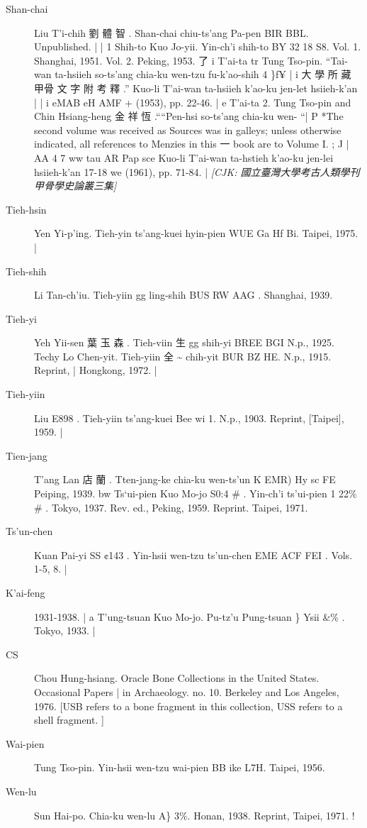 \begin{description}
  \item[Shan-chai] Liu T'i-chih 劉 體 智 . Shan-chai chiu-ts'ang Pa-pen BIR BBL. Unpublished. | | 1 Shih-to Kuo Jo-yii. Yin-ch'i shih-to BY 32 18 S8. Vol. 1. Shanghai, 1951. Vol. 2. Peking, 1953. 了 i T'ai-ta tr Tung Tso-pin. ``Tai-wan ta-hsiieh so-ts'ang chia-ku wen-tzu fu-k'ao-shih 4 \}f¥ | i 大 學 所 藏 甲骨 文 字 附 考 釋 .'' Kuo-li T'ai-wan ta-hsiieh k'ao-ku jen-let hsiieh-k'an | | i eMAB eH AMF + (1953), pp. 22-46. | e T'ai-ta 2. Tung Tso-pin and Chin Hsiang-heng 金 祥 恆 .````Pen-hsi so-ts'ang chia-ku wen- ``| P *The second volume was received as Sources was in galleys; unless otherwise indicated, all references to Menzies in this 一 book are to Volume I. ; J | AA 4 7 ww tau AR Pap sce Kuo-li T'ai-wan ta-hstieh k'ao-ku jen-lei hsiieh-k'an 17-18 we (1961), pp. 71-84. | \hfill\textit{[CJK: 國立臺灣大學考古人類學刊 甲骨學史論叢三集]}
  \item[T\textquotesingle{}ieh-hsin] Yen Yi-p'ing. Tieh-yin ts'ang-kuei hyin-pien WUE Ga Hf Bi. Taipei, 1975. |
  \item[Tieh-shih] Li Tan-ch'iu. Tieh-yiin gg ling-shih BUS RW AAG . Shanghai, 1939.
  \item[Tieh-yi] Yeh Yii-sen 葉 玉 森 . Tieh-viin 生 gg shih-yi BREE BGI N.p., 1925. Techy Lo Chen-yit. Tieh-yiin 全 \~{} chih-yit BUR BZ HE. N.p., 1915. Reprint, | Hongkong, 1972. |
  \item[Tieh-yiin] Liu E898 . Tieh-yiin ts'ang-kuei Bee wi 1. N.p., 1903. Reprint, [Taipei], 1959. |
  \item[Tien-jang] T'ang Lan 店 蘭 . Tten-jang-ke chia-ku wen-ts'un K EMR) Hy sc FE Peiping, 1939. bw Ts`ui-pien Kuo Mo-jo S0:4 \# . Yin-ch'i ts'ui-pien 1 22\% \# . Tokyo, 1937. Rev. ed., Peking, 1959. Reprint. Taipei, 1971.
  \item[Ts'un-chen] Kuan Pai-yi SS ¢143 . Yin-hsii wen-tzu ts'un-chen EME ACF FEI . Vols. 1-5, 8. |
  \item[K'ai-feng] 1931-1938. | a T'ung-tsuan Kuo Mo-jo. Pu-tz'u Pung-tsuan \} Ysii \&\% . Tokyo, 1933. |
  \item[CS] Chou Hung-hsiang. Oracle Bone Collections in the United States. Occasional Papers | in Archaeology. no. 10. Berkeley and Los Angeles, 1976. [USB refers to a bone fragment in this collection, USS refers to a shell fragment. ]
  \item[Wai-pien] Tung Tso-pin. Yin-hsii wen-tzu wai-pien BB ike L7H. Taipei, 1956.
  \item[Wen-lu] Sun Hai-po. Chia-ku wen-lu A\} 3\%. Honan, 1938. Reprint, Taipei, 1971. !

\end{description}
